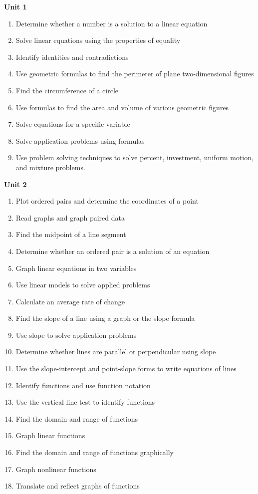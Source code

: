 \documentclass[11pt]{article}
\newenvironment{alphalist}{
\begin{enumerate}[label=(\arabic*),widest=107 ,leftmargin=25pt, itemsep=0pt]}
{\end{enumerate}}
\begin{document}
\noindent \textbf{Unit 1}
\begin{alphalist}
    \item Determine whether a number is a solution to a linear equation
    \item Solve linear equations using the properties of equality
    \item Identify identities and contradictions
    \item Use geometric formulas to find the perimeter of plane two-dimensional figures
    \item Find the circumference of a circle
    \item Use formulas to find the area and volume of various geometric figures
    \item Solve equations for a specific variable
    \item Solve application problems using formulas
    \item Use problem solving techniques to solve percent, investment, uniform motion, and mixture problems.
\end{alphalist}
\noindent \textbf{Unit 2}
\begin{alphalist}
    \item Plot ordered pairs and determine the coordinates of a point
    \item Read graphs and graph paired data
    \item Find the midpoint of a line segment
    \item Determine whether an ordered pair is a solution of an equation
    \item Graph linear equations in two variables
    \item Use linear models to solve applied problems
    \item Calculate an average rate of change
    \item Find the slope of a line using a graph or the slope formula
    \item Use slope to solve application problems
    \item Determine whether lines are parallel or perpendicular using slope
    \item Use the slope-intercept and point-slope forms to write equations of lines
    \item Identify functions and use function notation
    \item Use the vertical line test to identify functions
    \item Find the domain and range of functions
    \item Graph linear functions
    \item Find the domain and range of functions graphically
    \item Graph nonlinear functions
    \item Translate and reflect graphs of functions
\end{alphalist}
 
\end{document}
